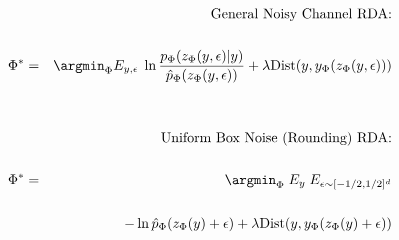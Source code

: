 {

{\huge
\begin{eqnarray*}
& & \mbox{General Noisy Channel RDA:} \\
\\
\Phi^* & = & \argmin_\Phi E_{y,\epsilon}\;\ln \frac{p_\Phi(z_\Phi(y,\epsilon)|y)}{\hat{p}_\Phi(z_\Phi(y,\epsilon))}
+ \lambda \mathrm{Dist}(y,y_\Phi(z_\Phi(y,\epsilon))) \\
\\
\\
& & \mbox{Uniform Box Noise (Rounding) RDA:} \\
\\
\Phi^* &  = & \argmin_\Phi \;E_y\;E_{\epsilon \sim [-1/2,1/2]^d} \\
\\
& & \;\;\;\;\;\;\;\;\;\;\;\;\;\;\;\; - \ln \hat{p}_\Phi(z_\Phi(y) + \epsilon) + \lambda \mathrm{Dist}(y,y_\Phi(z_\Phi(y) + \epsilon)) \\
\\
\end{eqnarray*}
}


}

